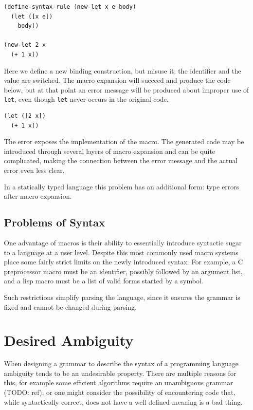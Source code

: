 \documentclass{kththesis}
\begin{document}
\begin{verbatim}
(define-syntax-rule (new-let x e body)
  (let ([x e])
    body))

(new-let 2 x
  (+ 1 x))
\end{verbatim}

Here we define a new binding construction, but misuse it; the identifier and the value are switched. The macro expansion will succeed and produce the code below, but at that point an error message will be produced about improper use of \texttt{let}, even though \texttt{let} never occurs in the original code.

\begin{verbatim}
(let ([2 x])
  (+ 1 x))
\end{verbatim}

The error exposes the implementation of the macro. The generated code may be introduced through several layers of macro expansion and can be quite complicated, making the connection between the error message and the actual error even less clear.

In a statically typed language this problem has an additional form: type errors after macro expansion.

\subsection{Problems of Syntax} \label{sec:problem-syntax}

One advantage of macros is their ability to essentially introduce syntactic sugar to a language at a user level. Despite this most commonly used macro systems place some fairly strict limits on the newly introduced syntax. For example, a C preprocessor macro must be an identifier, possibly followed by an argument list, and a lisp macro must be a list of valid forms started by a symbol.

Such restrictions simplify parsing the language, since it ensures the grammar is fixed and cannot be changed during parsing.

\section{Desired Ambiguity} \label{sec:desired-ambiguity}


When designing a grammar to describe the syntax of a programming language ambiguity tends to be an undesirable property. There are multiple reasons for this, for example some efficient algorithms require an unambiguous grammar (TODO: ref), or one might consider the possibility of encountering code that, while syntactically correct, does not have a well defined meaning is a bad thing.
\end{document}
